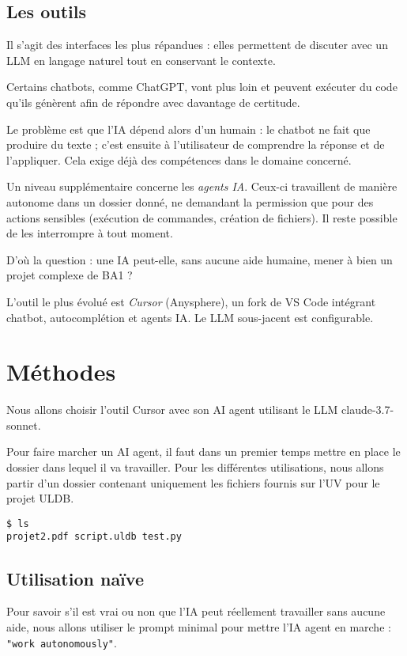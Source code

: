 \documentclass[utf8]{article}
\begin{document}
\subsection{Les outils}
Il s'agit des interfaces les plus répandues : elles permettent de discuter avec un LLM en langage naturel tout en conservant le contexte.

Certains chatbots, comme ChatGPT, vont plus loin et peuvent exécuter du code qu'ils génèrent afin de répondre avec davantage de certitude.

Le problème est que l'IA dépend alors d'un humain : le chatbot ne fait que produire du texte ; c'est ensuite à l'utilisateur de comprendre la réponse et de l'appliquer. Cela exige déjà des compétences dans le domaine concerné.

Un niveau supplémentaire concerne les \emph{agents IA}.  
Ceux-ci travaillent de manière autonome dans un dossier donné, ne demandant la permission que pour des actions sensibles (exécution de commandes, création de fichiers). Il reste possible de les interrompre à tout moment.

D'où la question : une IA peut-elle, sans aucune aide humaine, mener à bien un projet complexe de BA1 ?

L'outil le plus évolué est \textit{Cursor} (Anysphere), un fork de VS Code intégrant chatbot, autocomplétion et agents IA. Le LLM sous-jacent est configurable.

\section{Méthodes}

Nous allons choisir l'outil Cursor avec son AI agent utilisant le LLM claude-3.7-sonnet.

Pour faire marcher un AI agent, il faut dans un premier temps mettre en place le dossier dans lequel il va travailler. Pour les différentes utilisations, nous allons partir d'un dossier contenant uniquement les fichiers fournis sur l'UV pour le projet ULDB.

\begin{verbatim}
$ ls
projet2.pdf script.uldb test.py
\end{verbatim}

\subsection{Utilisation naïve}

Pour savoir s'il est vrai ou non que l'IA peut réellement travailler sans aucune aide,
nous allons utiliser le prompt minimal pour mettre l'IA agent en marche : \texttt{"work autonomously"}.
\end{document}
